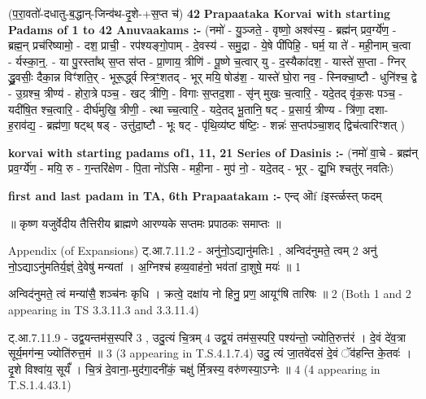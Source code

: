 \documentclass[17pt]{extarticle}
\begin{document}
{                  \newline
                                                        (प॒रा॒वतो॑-दधातु-ब॒द्धान्-जिन्व॑थ-दृ॒शे-+स॒प्त च॑) \textbf{42} \newline \newline
\textbf{Prapaataka Korvai with starting Padams of 1 to 42 Anuvaakams :-} \newline
(नमो॑ - यु॒ञ्जते॒ - वृष्णो॒ अश्व॑स्य॒ - ब्रह्म॑न् प्रव॒र्ग्ये॑ण॒ - ब्रह्म॒न् प्रच॑रिष्यामो॒ - दश॒ प्राची॒ - रप॑श्यङ्गो॒पाम् - दे॒वस्य॑ - समु॒द्रा - ये॒षे पी॑पिहि॒ - घर्म॒ या ते॑ - मही॒नाम् च॒त्वा - र्यस्का॒न्॒. - या पु॒रस्ता᳚थ् स॒प्त स॑प्त - प्रा॒णाय॒ त्रीणि॑ - पू॒ष्णे च॒त्वार् यु - द॒स्यैका॑दश॒ - यास्ते॑ स॒प्ता - ग्निर् द्ध्रु॒वसीः॒ दैका॒न्न विꣳ॑शति॒र् - भूरू॒र्द्ध्व स्त्रिꣳ॒॒शतद् - भूर् मयि॒ षोड॑श॒ - यास्ते॑ घो॒रा नव॒ - स्निक्चा॒ष्टौ - धुनि॑श्च॒ द्वे - उ॒ग्रश्च॒ त्रीण्य॑ - होरा॒त्रे पञ्च॒ - खट् त्रीणि॒ - विगाः स॒प्तद॒शा - सृ॑न् मुखः च॒त्वारि॒ - यदे॒तद् वृ॑क॒सः पञ्च॒ - यदी॑षि॒त श्च॒त्वारि॒ - दीर्घ॑मुखि॒ त्रीणी॒ - त्था च्च॒त्वारि॒ - यदे॒तद् भू॒तानि॒ षट् - प्र॒सार्य॒ त्रीण्य - त्रि॑णा॒ दशा- ह॒राव॑द्य॒ - ब्रह्म॑णा॒ षट्थ् षड् - उत्तु॑दा॒ष्टौ - भूः षट् - पृ॑थि॒व्य॑ष्ट ष॑ष्टिः॒ - शन्नः॑ स॒प्तप॑ञ्चा॒शद् द्विच॑त्वारिꣳशत् ) \newline

\textbf{korvai with starting padams of1, 11, 21 Series of Dasinis :-} \newline
(नमो॑ वा॒चे - ब्रह्म॑न् प्रव॒र्ग्ये॑ण॒ - मयि॒ रु - ग॒न्तरि॑क्षेण - पि॒ता नो॑ऽसि - मही॒ना - मुप॑ नो॒ - यदे॒तद् - भूर् - द्यू॒भि श्चतु॑र् नवतिः) \newline

\textbf{first and last padam in TA, 6th Prapaatakam :-} \newline
एन्द् ऒf fइर्स्त्ळस्त् फदम् \newline 


॥ कृष्ण यजुर्वेदीय तैत्तिरीय ब्राह्मणे आरण्यके सप्तमः प्रपाठकः समाप्तः ॥



Appendix (of Expansions)
ट्.आ.7.11.2 - अनु॑नो॒ऽद्यानु॑मतिः{1} , अन्विद॑नुमते॒ त्वम् {2} अनु॑ नो॒ऽद्याऽनु॑मतिर्य॒ज्ञ्ं दे॒वेषु॑ मन्यतां । 
अ॒ग्निश्च॑ हव्य॒वाह॑नो॒ भव॑तां दा॒शुषे॒ मयः॑ ॥ {1}

अन्विद॑नुमते॒ त्वं मन्या॑सै॒ शञ्च॑नः कृधि । 
क्रत्वे॒ दक्षा॑य नो हिनु॒ प्रण॒ आयूꣳ॑षि तारिषः ॥ {2} 
(Both {1} and {2} appearing in TS 3.3.11.3 and 3.3.11.4)

ट्.आ.7.11.9 - उद्व॒यन्तम॑स॒स्परि॑ {3} , उदु॒त्यं चि॒त्रम् {4} 
उद्व॒यं तम॑स॒स्परि॒ पश्य॑न्तो॒ ज्योति॒रुत्त॑रं । 
दे॒वं दे॑व॒त्रा सूर्य॒मग॑न्म॒ ज्योति॑रुत्त॒मं ॥ {3}
({3} appearing in T.S.4.1.7.4)
उदु॒ त्यं जा॒तवे॑दसं दे॒वं ॅव॑हन्ति के॒तवः॑ । दृ॒शे विश्वा॑य॒ सूर्यं᳚ । 
चि॒त्रं दे॒वाना॒-मुद॑गा॒दनी॑कं॒ चक्षु॑ र्मि॒त्रस्य॒ वरु॑णस्या॒ऽग्नेः ॥ {4}
({4} appearing in T.S.1.4.43.1)

}
\end{document}
